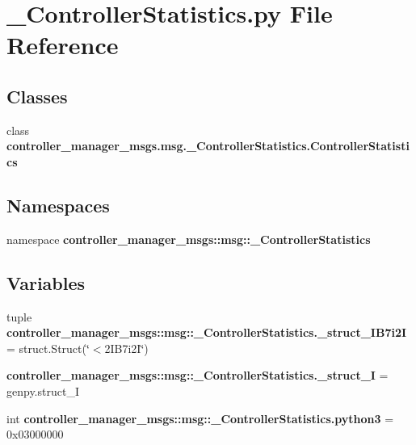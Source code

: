 \section{\-\_\-\-Controller\-Statistics.\-py \-File \-Reference}
\label{__ControllerStatistics_8py}
\subsection*{\-Classes}
\begin{DoxyCompactItemize}
\item 
class {\bf controller\-\_\-manager\-\_\-msgs.\-msg.\-\_\-\-Controller\-Statistics.\-Controller\-Statistics}
\end{DoxyCompactItemize}
\subsection*{\-Namespaces}
\begin{DoxyCompactItemize}
\item 
namespace {\bf controller\-\_\-manager\-\_\-msgs\-::msg\-::\-\_\-\-Controller\-Statistics}
\end{DoxyCompactItemize}
\subsection*{\-Variables}
\begin{DoxyCompactItemize}
\item 
tuple {\bf controller\-\_\-manager\-\_\-msgs\-::msg\-::\-\_\-\-Controller\-Statistics.\-\_\-struct\-\_\-I\-B7i2\-I} = struct.\-Struct(\char`\"{}$<$2\-I\-B7i2\-I\char`\"{})
\item 
{\bf controller\-\_\-manager\-\_\-msgs\-::msg\-::\-\_\-\-Controller\-Statistics.\-\_\-struct\-\_\-\-I} = genpy.\-struct\-\_\-\-I
\item 
int {\bf controller\-\_\-manager\-\_\-msgs\-::msg\-::\-\_\-\-Controller\-Statistics.\-python3} = 0x03000000
\end{DoxyCompactItemize}
